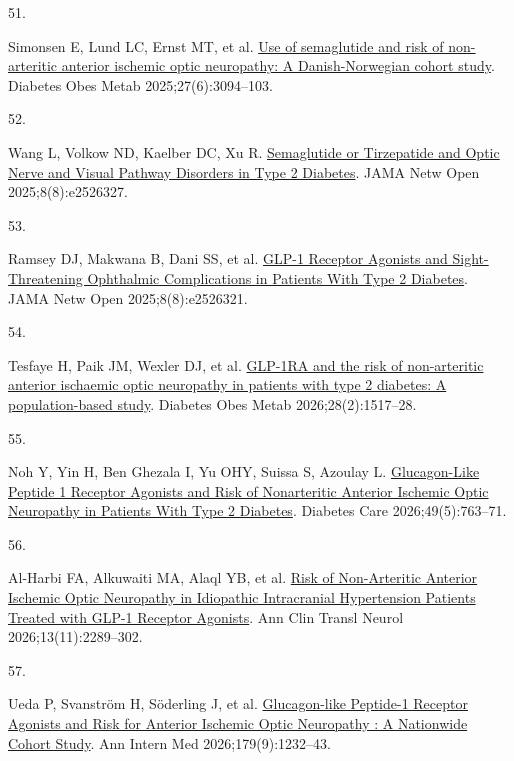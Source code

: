 \documentclass[
  11pt,
]{article}
\newlength{\cslhangindent}
\newlength{\csllabelwidth}
\newenvironment{CSLReferences}[2] %
 {\begin{list}{}{%
  \setlength{\itemindent}{0pt}
  \setlength{\leftmargin}{0pt}
  \setlength{\parsep}{0pt}
  \ifodd #1
   \setlength{\leftmargin}{\cslhangindent}
   \setlength{\itemindent}{-1\cslhangindent}
  \fi
  \setlength{\itemsep}{#2\baselineskip}}}
 {\end{list}}
\newcommand{\CSLLeftMargin}[1]{\parbox[t]{\csllabelwidth}{\strut#1\strut}}
\newcommand{\CSLRightInline}[1]{\parbox[t]{\linewidth - \csllabelwidth}{\strut#1\strut}}
\begin{document}
\begin{CSLReferences}{0}{1}
\CSLLeftMargin{51. }%
\CSLRightInline{Simonsen E, Lund LC, Ernst MT, et al.
\href{https://doi.org/10.1111/dom.16316}{{Use of semaglutide and risk of
non-arteritic anterior ischemic optic neuropathy: A Danish-Norwegian
cohort study}}. Diabetes Obes Metab 2025;27(6):3094--103. }

\CSLLeftMargin{52. }%
\CSLRightInline{Wang L, Volkow ND, Kaelber DC, Xu R.
\href{https://doi.org/10.1001/jamanetworkopen.2025.26327}{{Semaglutide
or Tirzepatide and Optic Nerve and Visual Pathway Disorders in Type 2
Diabetes}}. JAMA Netw Open 2025;8(8):e2526327. }

\CSLLeftMargin{53. }%
\CSLRightInline{Ramsey DJ, Makwana B, Dani SS, et al.
\href{https://doi.org/10.1001/jamanetworkopen.2025.26321}{{GLP-1
Receptor Agonists and Sight-Threatening Ophthalmic Complications in
Patients With Type 2 Diabetes}}. JAMA Netw Open 2025;8(8):e2526321. }

\CSLLeftMargin{54. }%
\CSLRightInline{Tesfaye H, Paik JM, Wexler DJ, et al.
\href{https://doi.org/10.1111/dom.70200}{{GLP-1RA and the risk of
non-arteritic anterior ischaemic optic neuropathy in patients with type
2 diabetes: A population-based study}}. Diabetes Obes Metab
2026;28(2):1517--28. }

\CSLLeftMargin{55. }%
\CSLRightInline{Noh Y, Yin H, Ben Ghezala I, Yu OHY, Suissa S, Azoulay
L. \href{https://doi.org/10.2337/dc25-2577}{{Glucagon-Like Peptide 1
Receptor Agonists and Risk of Nonarteritic Anterior Ischemic Optic
Neuropathy in Patients With Type 2 Diabetes}}. Diabetes Care
2026;49(5):763--71. }

\CSLLeftMargin{56. }%
\CSLRightInline{Al-Harbi FA, Alkuwaiti MA, Alaql YB, et al.
\href{https://doi.org/10.1002/acn3.70406}{{Risk of Non-Arteritic
Anterior Ischemic Optic Neuropathy in Idiopathic Intracranial
Hypertension Patients Treated with GLP-1 Receptor Agonists}}. Ann Clin
Transl Neurol 2026;13(11):2289--302. }

\CSLLeftMargin{57. }%
\CSLRightInline{Ueda P, Svanström H, Söderling J, et al.
\href{https://doi.org/10.7326/ANNALS-25-02096}{{Glucagon-like Peptide-1
Receptor Agonists and Risk for Anterior Ischemic Optic Neuropathy : A
Nationwide Cohort Study}}. Ann Intern Med 2026;179(9):1232--43. }

\end{CSLReferences}
\end{document}
